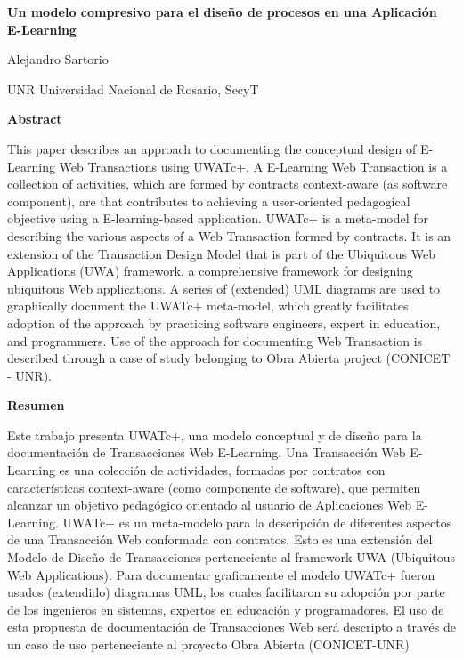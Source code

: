 \documentclass[12 pt,a4paper]{llncs}
\begin{document}
\begin{center}

{\Large \textbf{Un modelo compresivo para el diseño de procesos en una Aplicación E-Learning}}

\Medium

      
\bigskip

Alejandro Sartorio

\medskip

UNR Universidad Nacional de Rosario, SecyT

\end{center}

\bigskip

\begin{center}
\textbf{Abstract}
\end{center}

This paper describes an approach to documenting the conceptual
design of E-Learning Web Transactions using UWATc+. A E-Learning Web Transaction is
a collection of activities, which are formed by contracts context-aware (as software component),  are  that contributes to achieving a user-oriented pedagogical objective using a E-learning-based
application. UWATc+ is a meta-model for describing the various
aspects of a Web Transaction formed by contracts. It is an extension
of the Transaction Design Model that is part of the Ubiquitous Web
Applications (UWA) framework, a comprehensive framework for
designing ubiquitous Web applications. A series of (extended)
UML diagrams are used to graphically document the UWATc+
meta-model, which greatly facilitates adoption of the approach by
practicing software engineers,  expert in education, and programmers. Use of the
approach for documenting Web Transaction is described through a case of study belonging to Obra Abierta project (CONICET - UNR).
\medskip

\begin{center}
 \textbf{Resumen}
\end{center}

Este trabajo presenta UWATc+, una modelo conceptual y de diseño para la documentación de Transacciones Web E-Learning. Una Transacción Web E-Learning es una colección de actividades, formadas por contratos con características context-aware (como componente de software), que permiten alcanzar un objetivo pedagógico orientado al usuario de Aplicaciones Web E-Learning. UWATc+ es un meta-modelo para la descripción de diferentes aspectos de una Transacción Web conformada con contratos. Esto es una extensión del Modelo de Diseño de Transacciones perteneciente al framework UWA (Ubiquitous Web Applications). Para documentar graficamente el  modelo UWATc+ fueron usados (extendido) diagramas UML, los cuales facilitaron su adopción por parte de los ingenieros en sistemas, expertos en educación y programadores. El uso de esta propuesta de documentación de Transacciones Web  será descripto a través de un caso de uso perteneciente al proyecto Obra Abierta (CONICET-UNR)
\end{document}

